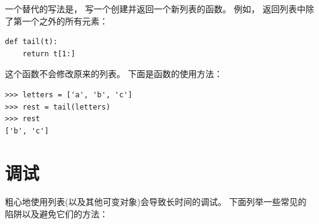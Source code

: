 
一个替代的写法是， 写一个创建并返回一个新列表的函数。
例如，  返回列表中除了第一个之外的所有元素：

\begin{lstlisting}
def tail(t):
    return t[1:]
\end{lstlisting}

%

这个函数不会修改原来的列表。  下面是函数的使用方法：

\begin{lstlisting}
>>> letters = ['a', 'b', 'c']
>>> rest = tail(letters)
>>> rest
['b', 'c']
\end{lstlisting}


\section{调试}


粗心地使用列表(以及其他可变对象)会导致长时间的调试。
下面列举一些常见的陷阱以及避免它们的方法：

